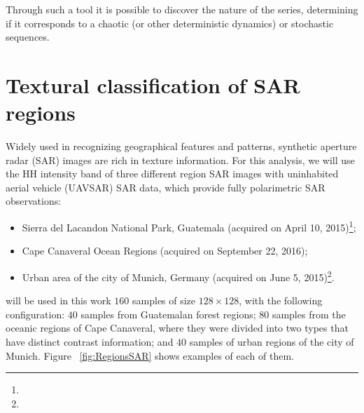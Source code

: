 \documentclass[paper=letter, fontsize=12pt]{article}
\begin{document}
Through such a tool it is possible to discover the nature of the series, determining if it corresponds to a chaotic (or other deterministic dynamics) or stochastic sequences.

\section{Textural classification of SAR regions}\label{SAR}

Widely used in recognizing geographical features and patterns, synthetic aperture radar (SAR) images are rich in texture information.
For this analysis, we will use the HH intensity band of three different region SAR images with uninhabited aerial vehicle (UAVSAR) SAR data, which provide fully polarimetric SAR observations:

\begin{itemize}
	\item Sierra del Lacandon National Park, Guatemala (acquired on April 10, 2015)\footnote{};
	\item Cape Canaveral Ocean Regions (acquired on September 22, 2016);
	\item Urban area of the city of Munich, Germany (acquired on June 5, 2015)\footnote{}.
\end{itemize}

will be used in this work $160$ samples of size $128 \times 128$, with the following configuration:
$40$ samples from Guatemalan forest regions;
$80$ samples from the oceanic regions of Cape Canaveral, where they were divided into two types that have distinct contrast information; and
$40$ samples of urban regions of the city of Munich.
Figure ~\ref{fig:RegionsSAR} shows examples of each of them.
\end{document}
